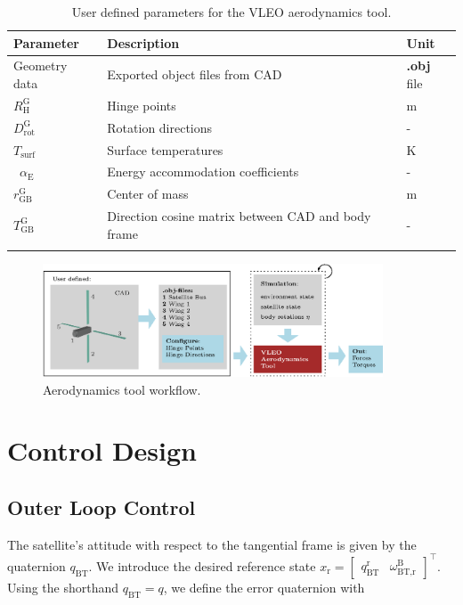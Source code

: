 \documentclass[pdflatex,sn-mathphys-num]{sn-jnl}%
\theoremstyle{thmstyleone}%
\theoremstyle{thmstyletwo}%
\theoremstyle{thmstylethree}%
\begin{document}
	\begin{table}[h]
		\renewcommand{\arraystretch}{1.2} %
		\centering
		\caption{User defined parameters for the VLEO aerodynamics tool.}	
		\footnotesize{
		\begin{tabular}{p{2cm}p{5cm}p{1.2cm}}
			\hline
			\textbf{Parameter}      & \textbf{Description} & \textbf{Unit} \\
			\hline
			Geometry data     & Exported object files from CAD & \textbf{.obj} file\\
			$R_{\text{H}}^{\text{G}}$ & Hinge points & m \\ 
			$D_{\text{rot}}^{\text{G}}$ & Rotation directions & - \\ 
			$T_{\text{surf}}$ & Surface temperatures & K \\\
			$\alpha_{\text{E}}$ & Energy accommodation coefficients & - \\
			$r_{\text{GB}}^{\text{G}}$ & Center of mass & m \\
			$T_{\text{GB}}^{\text{G}}$ & Direction cosine matrix between CAD and body frame & - \\
			\hline& 
		\end{tabular}
		\label{tab:parameters_vleo_aerodynamics_tool}
		}
	\end{table}
	
	\begin{figure}[h]
		\centering
		\includegraphics[width=0.9\textwidth]{Figures/fig8.eps}
		\caption{Aerodynamics tool workflow.}
			\label{fig:aerodynamics_tool_workflow}
	\end{figure}



    \section{Control Design}
	\label{sec:control_design}
	\subsection{Outer Loop Control}
	The satellite's attitude with respect to the tangential frame is given by the quaternion $q_{\text{BT}}$.
	We introduce the desired reference state $x_{\text{r}} = \begin{bmatrix}q_{\text{BT}}^{\text{r}} & \omega_{\text{BT,r}}^{\text{B}}\end{bmatrix}^{\top}$.
	Using the shorthand $q_{\text{BT}}=q$, we define the error quaternion with
\end{document}
